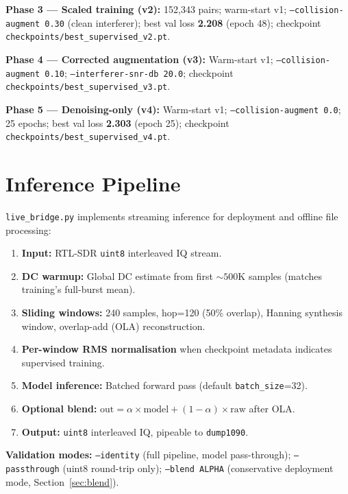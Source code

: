 \documentclass[11pt,a4paper]{article}
\begin{document}
\textbf{Phase 3 --- Scaled training (v2):}
152{,}343 pairs; warm-start v1; \texttt{--collision-augment 0.30} (clean
interferer); best val loss \textbf{2.208} (epoch 48); checkpoint
\texttt{checkpoints/best\_supervised\_v2.pt}.

\textbf{Phase 4 --- Corrected augmentation (v3):}
Warm-start v1; \texttt{--collision-augment 0.10};
\texttt{--interferer-snr-db 20.0}; checkpoint
\texttt{checkpoints/best\_supervised\_v3.pt}.

\textbf{Phase 5 --- Denoising-only (v4):}
Warm-start v1; \texttt{--collision-augment 0.0}; 25 epochs; best val loss
\textbf{2.303} (epoch 25); checkpoint
\texttt{checkpoints/best\_supervised\_v4.pt}.

\section{Inference Pipeline}

\texttt{live\_bridge.py} implements streaming inference for deployment and
offline file processing:
\begin{enumerate}[leftmargin=*]
  \item \textbf{Input:} RTL-SDR \texttt{uint8} interleaved IQ stream.
  \item \textbf{DC warmup:} Global DC estimate from first ${\sim}500$K samples
        (matches training's full-burst mean).
  \item \textbf{Sliding windows:} 240 samples, hop=120 (50\% overlap), Hanning
        synthesis window, overlap-add (OLA) reconstruction.
  \item \textbf{Per-window RMS normalisation} when checkpoint metadata indicates
        supervised training.
  \item \textbf{Model inference:} Batched forward pass (default
        \texttt{batch\_size}=32).
  \item \textbf{Optional blend:}
        $\mathrm{out} = \alpha \times \mathrm{model} + (1 - \alpha) \times
        \mathrm{raw}$ after OLA.
  \item \textbf{Output:} \texttt{uint8} interleaved IQ, pipeable to
        \texttt{dump1090}.
\end{enumerate}

\textbf{Validation modes:}
\texttt{--identity} (full pipeline, model pass-through);
\texttt{--passthrough} (uint8 round-trip only);
\texttt{--blend ALPHA} (conservative deployment mode, Section~\ref{sec:blend}).
\end{document}
